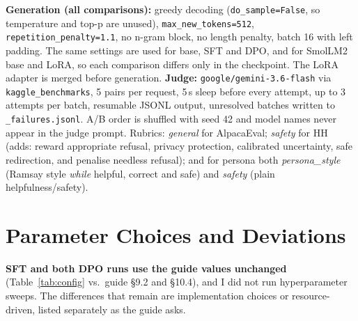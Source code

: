 \documentclass[10pt]{article}
\newcommand{\code}[1]{\texttt{\small #1}}
\begin{document}
\vspace{-0.5em}
\textbf{Generation (all comparisons):} greedy decoding (\code{do\_sample=False}, so temperature and top-p are unused), \code{max\_new\_tokens=512}, \code{repetition\_penalty=1.1}, no n-gram block, no length penalty, batch 16 with left padding. The same settings are used for base, SFT and DPO, and for SmolLM2 base and LoRA, so each comparison differs only in the checkpoint. The LoRA adapter is merged before generation.
\textbf{Judge:} \code{google/gemini-3.6-flash} via \code{kaggle\_benchmarks}, 5 pairs per request, 5\,s sleep before every attempt, up to 3 attempts per batch, resumable JSONL output, unresolved batches written to \code{*\_failures.jsonl}. A/B order is shuffled with seed 42 and model names never appear in the judge prompt. Rubrics: \emph{general} for AlpacaEval; \emph{safety} for HH (adds: reward appropriate refusal, privacy protection, calibrated uncertainty, safe redirection, and penalise needless refusal); and for persona both \emph{persona\_style} (Ramsay style \emph{while} helpful, correct and safe) and \emph{safety} (plain helpfulness/safety).

\section{Parameter Choices and Deviations}
\textbf{SFT and both DPO runs use the guide values unchanged} (Table~\ref{tab:config} vs.\ guide \S9.2 and \S10.4), and I did not run hyperparameter sweeps. The differences that remain are implementation choices or resource-driven, listed separately as the guide asks.
\end{document}
